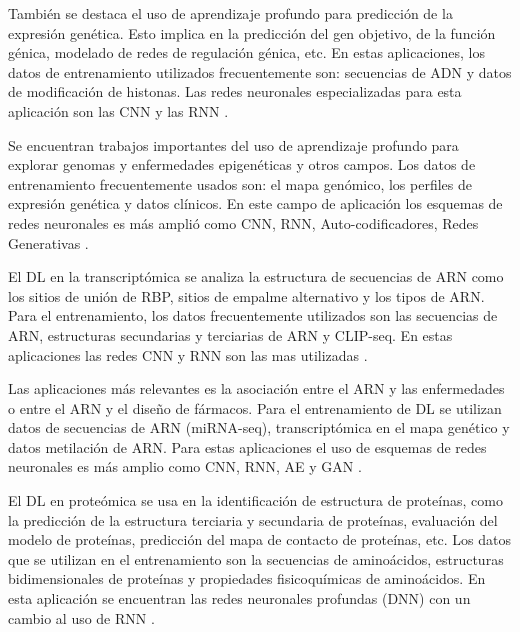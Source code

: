 También se destaca el uso de aprendizaje profundo para predicción de la expresión genética. Esto implica en la predicción del gen objetivo, de la función génica, modelado de redes de regulación génica, etc. En estas aplicaciones, los datos de entrenamiento utilizados frecuentemente son: secuencias de ADN y datos de modificación de histonas. Las redes neuronales especializadas para esta aplicación son las CNN y las RNN \citep{quang2016danq,raza2016recurrent,zhou2015predicting,cuperus2017deep,koh2017denoising}.

Se encuentran trabajos importantes del uso de aprendizaje profundo para explorar genomas y enfermedades epigenéticas y otros campos. Los datos de entrenamiento frecuentemente usados son: el mapa genómico, los perfiles de expresión genética y datos clínicos. En este campo de aplicación los esquemas de redes neuronales es más amplió como CNN, RNN, Auto-codificadores, Redes Generativas \citep{liang2014integrative,yousefi2017predicting,young2017unsupervised}.

El DL en la transcriptómica se analiza la estructura de secuencias de ARN como los sitios de unión de RBP, sitios de empalme alternativo y los tipos de ARN. Para el entrenamiento, los datos frecuentemente utilizados son las secuencias de ARN, estructuras secundarias y terciarias de ARN y CLIP-seq. En estas aplicaciones las redes CNN y RNN son las mas utilizadas \citep{xu2017deep,zhang2017sequence,pan2017rna}.

Las aplicaciones más relevantes es la asociación entre el ARN y las enfermedades o entre el ARN y el diseño de fármacos. Para el entrenamiento de DL se utilizan datos de secuencias de ARN (miRNA-seq), transcriptómica en el mapa genético y datos metilación de ARN. Para estas aplicaciones el uso de esquemas de redes neuronales es más amplio como CNN, RNN, AE y GAN \citep{chaudhary2018deep,yu2018drug,aliper2016deep,bhat2016deepcancer}.

El DL en proteómica se usa en la identificación de estructura de proteínas, como la predicción de la estructura terciaria y secundaria de proteínas, evaluación del modelo de proteínas, predicción del mapa de contacto de proteínas, etc. Los datos que se utilizan en el entrenamiento son la secuencias de aminoácidos, estructuras bidimensionales de proteínas y propiedades fisicoquímicas de aminoácidos. En esta aplicación se encuentran las redes neuronales profundas (DNN) con un cambio al uso de RNN \citep{stahl2017epsilon,li2017deep,spencer2014deep,heffernan2015improving}.

